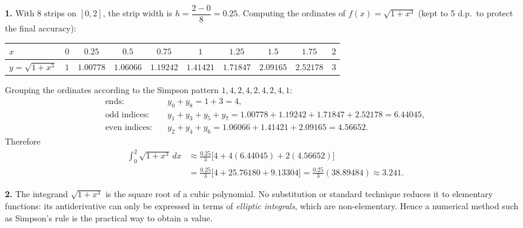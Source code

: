 \documentclass[11pt]{article}
\begin{document}
\begin{corrige}
\textbf{1.} With 8 strips on $[0,2]$, the strip width is $h = \dfrac{2-0}{8} = 0.25$. Computing the ordinates of $f(x) = \sqrt{1+x^3}$ (kept to 5 d.p.\ to protect the final accuracy):

\begin{center}
\begin{tabular}{|l|c|c|c|c|c|c|c|c|c|}
\hline
\rowcolor{popblueL} $x$ & $0$ & $0.25$ & $0.5$ & $0.75$ & $1$ & $1.25$ & $1.5$ & $1.75$ & $2$ \\
\hline
$y=\sqrt{1+x^3}$ & $1$ & $1.00778$ & $1.06066$ & $1.19242$ & $1.41421$ & $1.71847$ & $2.09165$ & $2.52178$ & $3$ \\
\hline
\end{tabular}
\end{center}

Grouping the ordinates according to the Simpson pattern $1, 4, 2, 4, 2, 4, 2, 4, 1$:
\begin{align*}
\text{ends:}\quad & y_0 + y_8 = 1 + 3 = 4,\\
\text{odd indices:}\quad & y_1+y_3+y_5+y_7 = 1.00778+1.19242+1.71847+2.52178 = 6.44045,\\
\text{even indices:}\quad & y_2+y_4+y_6 = 1.06066+1.41421+2.09165 = 4.56652.
\end{align*}
Therefore
\begin{align*}
\int_0^2 \sqrt{1+x^3}\,dx &\approx \frac{0.25}{3}\Big[4 + 4(6.44045) + 2(4.56652)\Big] \\
&= \frac{0.25}{3}\big[4 + 25.76180 + 9.13304\big] = \frac{0.25}{3}(38.89484) \approx 3.241.
\end{align*}

\textbf{2.} The integrand $\sqrt{1+x^3}$ is the square root of a cubic polynomial. No substitution or standard technique reduces it to elementary functions: its antiderivative can only be expressed in terms of \emph{elliptic integrals}, which are non-elementary. Hence a numerical method such as Simpson's rule is the practical way to obtain a value.
\end{corrige}
\end{document}
